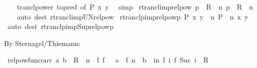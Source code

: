 \begin{isabellebody}
%
\isadelimproof
\ \ %
\endisadelimproof
%
\isatagproof
{}\isamarkupfalse%
\ trancl{\isacharunderscore}{\kern0pt}power\ {\isacharbrackleft}{\kern0pt}to{\isacharunderscore}{\kern0pt}pred{\isacharcomma}{\kern0pt}\ of\ P\ {\isachardoublequoteopen}{\isacharparenleft}{\kern0pt}x{\isacharcomma}{\kern0pt}\ y{\isacharparenright}{\kern0pt}{\isachardoublequoteclose}{\isacharbrackright}{\kern0pt}\ \isamarkupfalse%
\ simp%
\endisatagproof
{\isafoldproof}%
%
\isadelimproof
\isanewline
%
\endisadelimproof
\isanewline
{}\isamarkupfalse%
\ rtrancl{\isacharunderscore}{\kern0pt}imp{\isacharunderscore}{\kern0pt}relpow{\isacharcolon}{\kern0pt}\ {\isachardoublequoteopen}p\ {\isasymin}\ R\isactrlsup {\isacharasterisk}{\kern0pt}\ {\isasymLongrightarrow}\ {\isasymexists}n{\isachardot}{\kern0pt}\ p\ {\isasymin}\ R\ {\isacharcircum}{\kern0pt}{\isacharcircum}{\kern0pt}\ n{\isachardoublequoteclose}\isanewline
%
\isadelimproof
\ \ %
\endisadelimproof
%
\isatagproof
{}\isamarkupfalse%
\ {\isacharparenleft}{\kern0pt}auto\ dest{\isacharcolon}{\kern0pt}\ rtrancl{\isacharunderscore}{\kern0pt}imp{\isacharunderscore}{\kern0pt}UN{\isacharunderscore}{\kern0pt}relpow{\isacharparenright}{\kern0pt}%
\endisatagproof
{\isafoldproof}%
%
\isadelimproof
\isanewline
%
\endisadelimproof
\isanewline
{}\isamarkupfalse%
\ rtranclp{\isacharunderscore}{\kern0pt}imp{\isacharunderscore}{\kern0pt}relpowp{\isacharcolon}{\kern0pt}\ {\isachardoublequoteopen}{\isacharparenleft}{\kern0pt}P\isactrlsup {\isacharasterisk}{\kern0pt}\isactrlsup {\isacharasterisk}{\kern0pt}{\isacharparenright}{\kern0pt}\ x\ y\ {\isasymLongrightarrow}\ {\isasymexists}n{\isachardot}{\kern0pt}\ {\isacharparenleft}{\kern0pt}P\ {\isacharcircum}{\kern0pt}{\isacharcircum}{\kern0pt}\ n{\isacharparenright}{\kern0pt}\ x\ y{\isachardoublequoteclose}\isanewline
%
\isadelimproof
\ \ %
\endisadelimproof
%
\isatagproof
{}\isamarkupfalse%
\ {\isacharparenleft}{\kern0pt}auto\ dest{\isacharcolon}{\kern0pt}\ rtranclp{\isacharunderscore}{\kern0pt}imp{\isacharunderscore}{\kern0pt}Sup{\isacharunderscore}{\kern0pt}relpowp{\isacharparenright}{\kern0pt}%
\endisatagproof
{\isafoldproof}%
%
\isadelimproof
%
\endisadelimproof
%
\begin{isamarkuptext}%
By Sternagel/Thiemann:%
\end{isamarkuptext}\isamarkuptrue%
\isamarkupfalse%
\ relpow{\isacharunderscore}{\kern0pt}fun{\isacharunderscore}{\kern0pt}conv{\isacharcolon}{\kern0pt}\ {\isachardoublequoteopen}{\isacharparenleft}{\kern0pt}a{\isacharcomma}{\kern0pt}\ b{\isacharparenright}{\kern0pt}\ {\isasymin}\ R\ {\isacharcircum}{\kern0pt}{\isacharcircum}{\kern0pt}\ n\ {\isasymlongleftrightarrow}\ {\isacharparenleft}{\kern0pt}{\isasymexists}f{\isachardot}{\kern0pt}\ f\ {}\ {\isacharequal}{\kern0pt}\ a\ {\isasymand}\ f\ n\ {\isacharequal}{\kern0pt}\ b\ {\isasymand}\ {\isacharparenleft}{\kern0pt}{\isasymforall}i{\isacharless}{\kern0pt}n{\isachardot}{\kern0pt}\ {\isacharparenleft}{\kern0pt}f\ i{\isacharcomma}{\kern0pt}\ f\ {\isacharparenleft}{\kern0pt}Suc\ i{\isacharparenright}{\kern0pt}{\isacharparenright}{\kern0pt}\ {\isasymin}\ R{\isacharparenright}{\kern0pt}{\isacharparenright}{\kern0pt}{\isachardoublequoteclose}\isanewline

\end{isabellebody}
